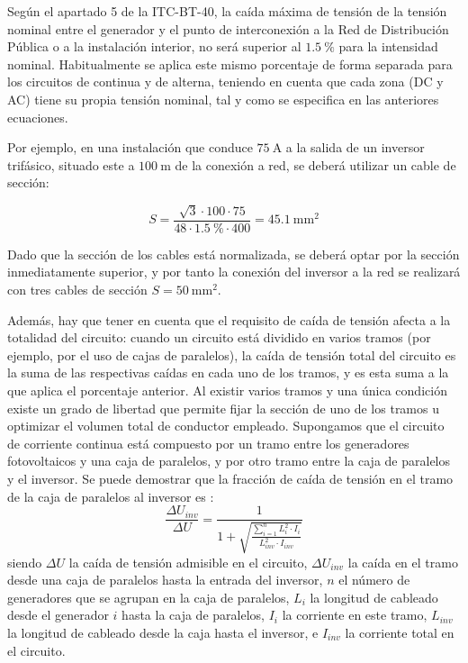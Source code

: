 Según el apartado 5 de la ITC-BT-40, la caída máxima de tensión de la
tensión nominal entre el generador y el punto de interconexión a la
Red de Distribución Pública o a la instalación interior, no será
superior al $\SI{1.5}{\percent}$ para la intensidad nominal.
Habitualmente se aplica este mismo porcentaje de forma separada para
los circuitos de continua y de alterna, teniendo en cuenta que cada
zona (DC y AC) tiene su propia tensión nominal, tal y como se
especifica en las anteriores ecuaciones.

Por ejemplo, en una instalación que conduce $\SI{75}{\ampere}$ a la
salida de un inversor trifásico, situado este a $\SI{100}{\meter}$ de
la conexión a red, se deberá utilizar un cable de sección:

\[
  S=\frac{\sqrt{3}\cdot100\cdot75}{48\cdot \SI{1.5}{\percent}\cdot400}=\SI{45.1}{\milli\meter\squared}
\]

Dado que la sección de los cables está normalizada, se deberá optar
por la sección inmediatamente superior, y por tanto la conexión del
inversor a la red se realizará con tres cables de sección
$S=\SI{50}{\milli\meter\squared}$.

Además, hay que tener en cuenta que el requisito de caída de tensión
afecta a la totalidad del circuito: cuando un circuito está dividido
en varios tramos (por ejemplo, por el uso de cajas de paralelos), la
caída de tensión total del circuito es la suma de las respectivas
caídas en cada uno de los tramos, y es esta suma a la que aplica el
porcentaje anterior. Al existir varios tramos y una única condición
existe un grado de libertad que permite fijar la sección de uno de los
tramos u optimizar el volumen total de conductor empleado. Supongamos
que el circuito de corriente continua está compuesto por un tramo
entre los generadores fotovoltaicos y una caja de paralelos, y por otro
tramo entre la caja de paralelos y el inversor. Se puede demostrar que
la fracción de caída de tensión en el tramo de la caja de paralelos al
inversor es \cite{Perpinan2012b}:
\begin{equation}
  \frac{\Delta U_{inv}}{\Delta U}= \frac{1}{1+\sqrt{\frac{\sum_{i=1}^nL_{i}^2
        \cdot I_{i}}{L_{inv}^2 \cdot I_{inv}}}}
\end{equation}
siendo $\Delta U$ la caída de tensión admisible en el circuito,
$\Delta U_{inv}$ la caída en el tramo desde una caja de paralelos
hasta la entrada del inversor, $n$ el número de generadores que se
agrupan en la caja de paralelos, $L_i$ la longitud de cableado desde
el generador $i$ hasta la caja de paralelos, $I_i$ la corriente en
este tramo, $L_{inv}$ la longitud de cableado desde la caja hasta el
inversor, e $I_{inv}$ la corriente total en el circuito.

